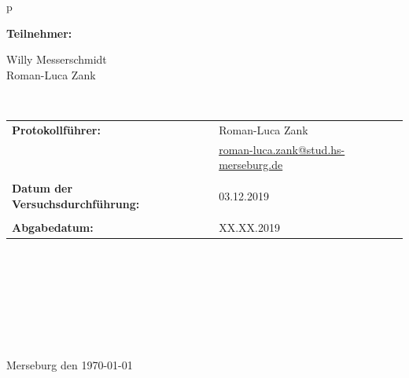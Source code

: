 \begin{center}
\begin{tabular}{p{\textwidth}}
\begin{center}
\Large{\textbf{Teilnehmer:}} \\ 
\end{center}
\begin{center}
\large{Willy Messerschmidt \\
		Roman-Luca Zank} \\
\end{center}


\\

\begin{center}
\begin{tabular}{lll}
\large{\textbf{Protokollführer:}} & & \large{Roman-Luca Zank} \\
& & \href{mailto:roman-luca.zank@stud.hs-merseburg.de}{{\footnotesize roman-luca.zank@stud.hs-merseburg.de}}\\
&&\\
\large{\textbf{Datum der Versuchsdurchführung:}}&& \large{03.12.2019}\\
&&\\
\large{\textbf{Abgabedatum:}}&& \large{XX.XX.2019}
\end{tabular}
\end{center}

\\ \\ \\ \\ \\ \\ \\ 
\large{Merseburg den \today}

\end{tabular}
\end{center}
